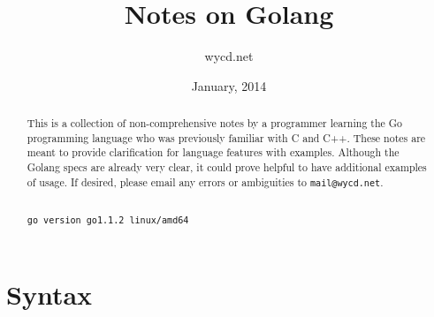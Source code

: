 \documentclass[12pt]{article}
\title{Notes on Golang}
\author{wycd.net}
\date{January, 2014}
\begin{document}
\maketitle

\begin{abstract}
This is a collection of non-comprehensive notes by a programmer learning the
Go programming language who was previously familiar with C and C++. These
notes are meant to provide clarification for language features with examples.
Although the Golang specs are already very clear, it could prove helpful to
have additional examples of usage. If desired, please email any errors or
ambiguities to \texttt{mail@wycd.net}.

\mbox{}\\
\texttt{go version go1.1.2 linux/amd64}
\end{abstract}

\tableofcontents
\clearpage

\section{Syntax}
\end{document}
